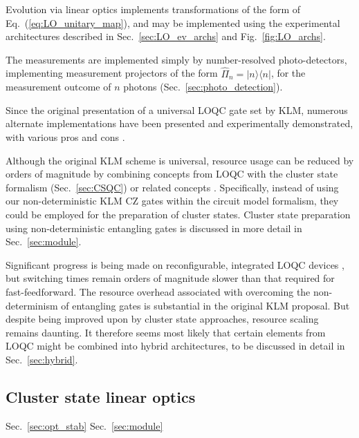 \documentclass[aps, rmp, twocolumn, amsmath, amssymb, nofootinbib, superscriptaddress, longbibliography, floatfix, table-of-contents, eqsecnum]{revtex4-1}
\newcommand{\bra}[1]{\langle#1|}
\newcommand{\ket}[1]{|#1\rangle}
\newcommand{\comment}[1]{{\color{blue}{\textbf{#1}}}}
\begin{document}
Evolution via linear optics implements transformations of the form of Eq.~(\ref{eq:LO_unitary_map}), and may be implemented using the experimental architectures described in Sec.~\ref{sec:LO_ev_archs} and Fig.~\ref{fig:LO_archs}.

The measurements are implemented simply by number-resolved photo-detectors, implementing measurement projectors of the form \mbox{$\hat\Pi_n=\ket{n}\bra{n}$}, for the measurement outcome of $n$ photons (Sec.~\ref{sec:photo_detection}).

Since the original presentation of a universal LOQC gate set by KLM, numerous alternate implementations have been presented and experimentally demonstrated, with various pros and cons \cite{bib:Ralph01, bib:Pittman01, bib:Ralph02, bib:Knill02, bib:Pittman03, bib:MorYoran06}.

Although the original KLM scheme is universal, resource usage can be reduced by orders of magnitude by combining concepts from LOQC with the cluster state formalism (Sec.~\ref{sec:CSQC}) or related concepts \cite{bib:YoranReznik03, bib:Nielsen04, bib:BrowneRudolph05, bib:GilchristHayes05, bib:Lim05, bib:LimBarrett05}. Specifically, instead of using our non-deterministic KLM CZ gates within the circuit model formalism, they could be employed for the preparation of cluster states. Cluster state preparation using non-deterministic entangling gates is discussed in more detail in Sec.~\ref{sec:module}.

Significant progress is being made on reconfigurable, integrated LOQC devices \cite{bib:UniversalLOOBrien}, but switching times remain orders of magnitude slower than that required for fast-feedforward. The resource overhead associated with overcoming the non-determinism of entangling gates is substantial in the original KLM proposal. But despite being improved upon by cluster state approaches, resource scaling remains daunting. It therefore seems most likely that certain elements from LOQC might be combined into hybrid architectures, to be discussed in detail in Sec.~\ref{sec:hybrid}.

%
%

\subsection{Cluster state linear optics} \label{sec:CS_LO} 

Sec.~\ref{sec:opt_stab}
Sec.~\ref{sec:module}

\comment{To do!}
\end{document}
